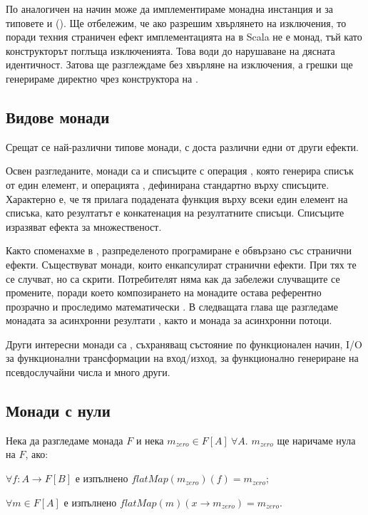 По аналогичен на  начин може да имплементираме монадна инстанция и за типовете  и  (). Ще отбележим, че ако разрешим хвърлянето на изключения, то поради техния страничен ефект имплементацията на  в Scala не е монад, тъй като  конструкторът поглъща изключенията. Това води до нарушаване на дясната идентичност. Затова ще разглеждаме  без хвърляне на изключения, а грешки ще генерираме директно чрез конструктора на .

\subsection{Видове монади}

Срещат се най-различни типове монади, с доста различни едни от други ефекти.

Освен разгледаните, монади са и списъците с  операция , която генерира списък от един елемент, и операцията , дефинирана стандартно върху списъците. Характерно е, че тя прилага подадената функция върху всеки един елемент на списъка, като резултатът е конкатенация на резултатните списъци. Списъците изразяват ефекта за множественост.

Както споменахме в , разпределеното програмиране е обвързано със странични ефекти. Съществуват монади, които енкапсулират странични ефекти. При тях те се случват, но са скрити. Потребителят няма как да забележи случващите се промените, поради което композирането на монадите остава референтно прозрачно и проследимо математически \cite[секция 3.2.4.2]{haskellwikiFP}. В следващата глава ще разгледаме монадата за асинхронни резултати , както и монада за асинхронни потоци.

Други интересни монади са , съхраняващ състояние по функционален начин, I/O за функционални трансформации на вход/изход,  за функционално генериране на псевдослучайни числа и много други.

\subsection{Монади с нули}

Нека да разгледаме монада $F$ и нека $m_{zero} \in F[A]~\forall A$. $m_{zero}$ ще наричаме нула на $F$, ако:

\begin{itemize*}
  \item $\forall f: A \rightarrow F[B]$ е изпълнено $flatMap(m_{zero})(f) = m_{zero}$;
  \item $\forall m \in F[A]$ е изпълнено $flatMap(m)(x \rightarrow m_{zero}) = m_{zero}$.
\end{itemize*}

